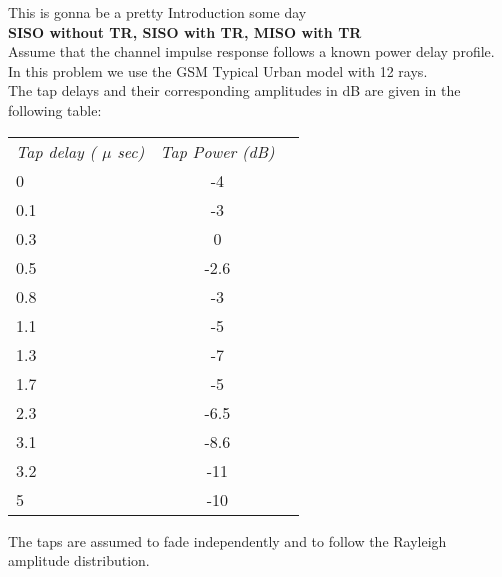This is gonna be a pretty Introduction some day\\
\textbf{SISO without TR, SISO with TR, MISO with TR}\\

Assume that the channel impulse response follows a known power delay profile. In this problem we use the GSM Typical Urban model with 12 rays.\\ The tap delays and their corresponding amplitudes in dB are given in the following table: 
\begin{center}
\begin{tabular}{lcr}
{\em Tap delay ( $\mu$ sec)\/} & {\em Tap Power (dB)\/} \\
0 & -4  \\
0.1 & -3 \\
0.3 & 0 \\
0.5 & -2.6\\
0.8 & -3\\
1.1 & -5\\
1.3 & -7\\
1.7 & -5\\
2.3 & -6.5\\
3.1 & -8.6\\
3.2 & -11\\
5 & -10
\end{tabular}
\end{center} 

The taps are assumed to fade independently and to follow the Rayleigh amplitude distribution. 